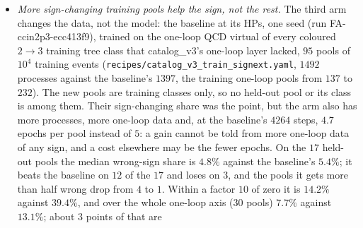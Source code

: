 \documentclass[11pt]{article}
\newcommand{\code}[1]{\texttt{#1}}
\begin{document}
\begin{itemize}
\begin{figure}[t]
{gradient norm, at the validation interval they fall in. (b) Median sign accuracy on the sign-changing training pools at
each validation.}\label{fig:v3_pair_head_blowup}
\end{figure}
  \item \emph{More sign-changing training pools help the sign, not the rest.} The third arm changes the data, not the
    model: the baseline at its HPs, one seed (run FA-ccin2p3-ecc413f9), trained on the one-loop QCD virtual of every
    coloured $2\to3$ training tree class that catalog\_v3's one-loop layer lacked, $95$ pools of $10^4$ training events
    (\code{recipes/catalog\_v3\_train\_signext.yaml}, $1492$ processes against the baseline's $1397$, the training
    one-loop pools from $137$ to $232$). The new pools are training classes only, so no held-out pool or its class is
    among them. Their sign-changing share was the point, but the arm also has more processes, more one-loop data
    and, at the baseline's $4264$ steps, $4.7$ epochs per pool instead of $5$: a gain cannot be told from more one-loop
    data of any sign, and a cost elsewhere may be the fewer epochs. On the $17$ held-out pools the median wrong-sign
    share is $4.8\%$ against the baseline's $5.4\%$; it beats the baseline on $12$ of the $17$ and loses on $3$, and the
    pools it gets more than half wrong drop from $4$ to $1$. Within a factor $10$ of zero it is $14.2\%$ against
    $39.4\%$, and over the whole one-loop axis ($30$ pools) $7.7\%$ against $13.1\%$; about $3$ points of that are

\end{itemize}
\end{document}
